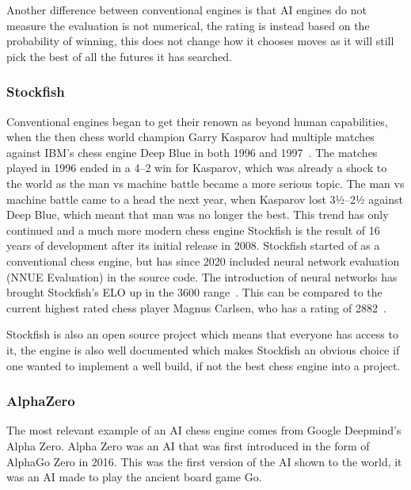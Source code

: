 Another difference between conventional engines is that AI engines do not measure the evaluation is not numerical, the
rating is instead based on the probability of winning, this does not change how it chooses moves as it will still pick
the best of all the futures it has searched.

\subsubsection{Stockfish}\label{subsubsec:stockfish}

Conventional engines began to get their renown as beyond human capabilities, when the then chess world champion
Garry Kasparov had multiple matches against IBM's chess engine Deep Blue in both 1996 and
1997~\cite{Garry-Kasparov-vs-Deep-Blue}.
The matches played in 1996 ended in a 4--2 win for Kasparov, which was already a shock to the world as the man vs
machine battle became a more serious topic.
The man vs machine battle came to a head the next year, when Kasparov lost 3½--2½ against Deep Blue, which meant that
man was no longer the best.
This trend has only continued and a much more modern chess engine Stockfish is the result of 16 years of development
after its initial release in 2008.
Stockfish started of as a conventional chess engine, but has since 2020 included neural network
evaluation (NNUE Evaluation) in the source code.
The introduction of neural networks has brought Stockfish's ELO up in the 3600 range~\cite{Stockfish}.
This can be compared to the current highest rated chess player Magnus Carlsen, who has a
rating of 2882~\cite{highest-ELO-chess-player}.

Stockfish is also an open source project which means that everyone has access to it, the engine is also well documented
which makes Stockfish an obvious choice if one wanted to implement a well build, if not the best chess engine into a
project.

\subsubsection{AlphaZero}\label{subsubsec:alphazero}

The most relevant example of an AI chess engine comes from Google Deepmind's Alpha Zero.
Alpha Zero was an AI that was first introduced in the form of AlphaGo Zero in 2016.
This was the first version of the AI shown to the world, it was an AI made to play the ancient board game Go.

